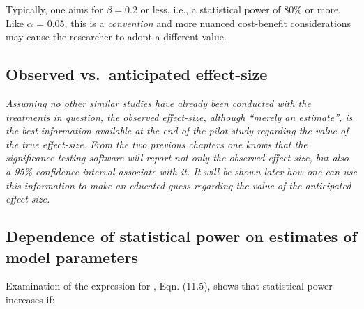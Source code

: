\documentclass[
]{book}
\begin{document}
Typically, one aims for \(\beta = 0.2\) or less, i.e., a statistical power of 80\% or more. Like \(\alpha\) = 0.05, this is a \emph{convention} and more nuanced cost-benefit considerations may cause the researcher to adopt a different value.

\hypertarget{observed-vs.-anticipated-effect-size}{%
\subsection{Observed vs.~anticipated effect-size}\label{observed-vs.-anticipated-effect-size}}

\emph{Assuming no other similar studies have already been conducted with the treatments in question, the observed effect-size, although ``merely an estimate'', is the best information available at the end of the pilot study regarding the value of the true effect-size. From the two previous chapters one knows that the significance testing software will report not only the observed effect-size, but also a 95\% confidence interval associate with it. It will be shown later how one can use this information to make an educated guess regarding the value of the anticipated effect-size.}

\hypertarget{roc-sample-size-dbm-dependence-of-stats-power}{%
\subsection{Dependence of statistical power on estimates of model parameters}\label{roc-sample-size-dbm-dependence-of-stats-power}}

Examination of the expression for , Eqn. (11.5), shows that statistical power increases if:
\end{document}
